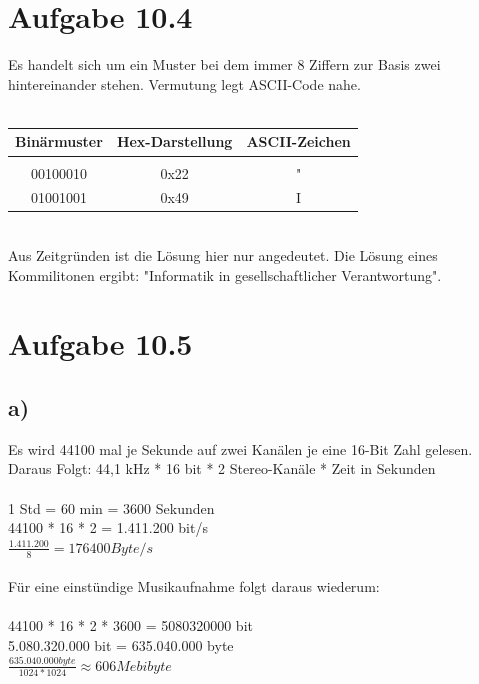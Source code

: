 \documentclass{article}
\begin{document}
	\section*{Aufgabe 10.4}
	Es handelt sich um ein Muster bei dem immer 8 Ziffern zur Basis zwei hintereinander stehen. Vermutung legt ASCII-Code nahe.\\ \\
	\begin{tabular}[h]{c|c|c}
		Binärmuster & Hex-Darstellung & ASCII-Zeichen \\
		\hline \\
		00100010 & 0x22 & " \\
		01001001 & 0x49 & I \\ 
	\end{tabular} \\
	Aus Zeitgründen ist die Lösung hier nur angedeutet. Die Lösung eines Kommilitonen ergibt: "Informatik in gesellschaftlicher Verantwortung".
	\section*{Aufgabe 10.5}
	\subsection*{a)}
	Es wird 44100 mal je Sekunde auf zwei Kanälen je eine 16-Bit Zahl gelesen. \\
	Daraus Folgt: 44,1 kHz * 16 bit * 2 Stereo-Kanäle * Zeit in Sekunden \\ \\
	1 Std = 60 min = 3600 Sekunden \\
	44100 * 16 * 2 = 1.411.200 bit/s \\
	$\frac{1.411.200}{8} = 176400 Byte/s$ \\ \\
	Für eine einstündige Musikaufnahme folgt daraus wiederum: \\ \\
	44100 * 16 * 2 * 3600 = 5080320000 bit \\
	5.080.320.000 bit = 635.040.000 byte \\
	$\frac{635.040.000 byte}{1024*1024} \approx 606 Mebibyte$
\end{document}
